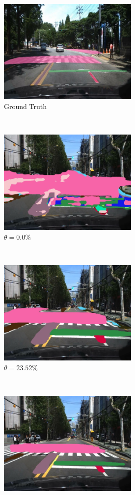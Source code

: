 \begin{spacing}{1.5}
\begin{figure}[!ht]
    \centering
    \begin{subfigure}[b]{0.49\textwidth}
        \centering
        \includegraphics[width=2.7in, fbox]{Chapter5/Picture1an.jpg}
        \caption{Ground Truth}
    \end{subfigure}%
    ~
    \begin{subfigure}[b]{0.49\textwidth}
        \centering
        \includegraphics[width=2.7in, fbox]{Chapter5/pic2con0.png}
        \caption{$\theta = 0.0\%$}
    \end{subfigure}
    \\
    \begin{subfigure}[b]{0.49\textwidth}
        \centering
        \includegraphics[width=2.7in, fbox]{Chapter5/pic2con23.png}
        \caption{$\theta = 23.52\%$}
    \end{subfigure}%
    ~
    \begin{subfigure}[b]{0.49\textwidth}
        \centering
        \includegraphics[width=2.7in, fbox]{Chapter5/pic2con70.png}

\end{subfigure}
\end{figure}
\end{spacing}
